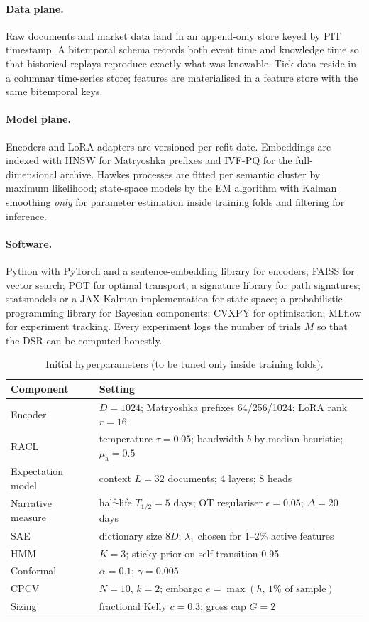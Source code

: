 \documentclass[11pt,a4paper]{article}
\theoremstyle{plain}
\theoremstyle{definition}
\theoremstyle{remark}
\begin{document}
\paragraph{Data plane.} Raw documents and market data land in an append-only store keyed by PIT timestamp. A bitemporal schema records both event time and knowledge time so that historical replays reproduce exactly what was knowable. Tick data reside in a columnar time-series store; features are materialised in a feature store with the same bitemporal keys.

\paragraph{Model plane.} Encoders and LoRA adapters are versioned per refit date. Embeddings are indexed with HNSW for Matryoshka prefixes and IVF-PQ for the full-dimensional archive. Hawkes processes are fitted per semantic cluster by maximum likelihood; state-space models by the EM algorithm with Kalman smoothing \emph{only} for parameter estimation inside training folds and filtering for inference.

\paragraph{Software.} Python with PyTorch and a sentence-embedding library for encoders; FAISS for vector search; POT for optimal transport; a signature library for path signatures; statsmodels or a JAX Kalman implementation for state space; a probabilistic-programming library for Bayesian components; CVXPY for optimisation; MLflow for experiment tracking. Every experiment logs the number of trials $M$ so that the DSR can be computed honestly.

\begin{table}[ht]
\centering
\caption{Initial hyperparameters (to be tuned only inside training folds).}\label{tab:hyper}
\small
\begin{tabularx}{\textwidth}{@{}lX@{}}
\toprule
Component & Setting \\
\midrule
Encoder & $D=1024$; Matryoshka prefixes 64/256/1024; LoRA rank $r=16$ \\
RACL & temperature $\tau=0.05$; bandwidth $b$ by median heuristic; $\mu_{\mathrm a}=0.5$ \\
Expectation model & context $L=32$ documents; 4 layers; 8 heads \\
Narrative measure & half-life $T_{1/2}=5$ days; OT regulariser $\epsilon=0.05$; $\Delta=20$ days \\
SAE & dictionary size $8D$; $\lambda_1$ chosen for 1--2\% active features \\
HMM & $K=3$; sticky prior on self-transition 0.95 \\
Conformal & $\alpha=0.1$; $\gamma=0.005$ \\
CPCV & $N=10$, $k=2$; embargo $e=\max(h,\,1\%\text{ of sample})$ \\
Sizing & fractional Kelly $c=0.3$; gross cap $G=2$ \\
\bottomrule
\end{tabularx}
\end{table}
\end{document}
